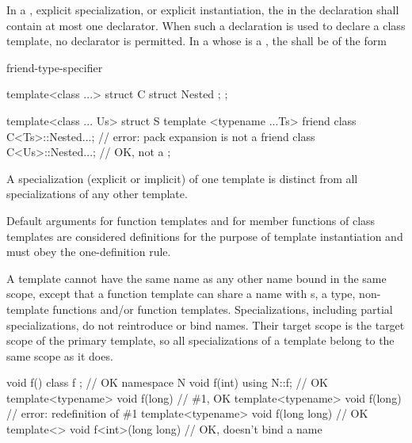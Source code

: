 \pnum
In a
,
explicit specialization, or explicit instantiation, the
in the declaration shall contain at most one declarator.
When such a declaration is used to declare a class template,
no declarator is permitted.
In a 
whose  is a ,
the  shall be of the form
\begin{ncsimplebnf}
 friend-type-specifier \terminal{;}
\end{ncsimplebnf}
\begin{example}
\begin{codeblock}
template<class ...>
struct C {
  struct Nested { };
};

template<class ... Us>
struct S {
  template <typename ...Ts>
  friend class C<Ts>::Nested...;        // error: pack expansion is not a 
  friend class C<Us>::Nested...;        // OK, not a 
};
\end{codeblock}
\end{example}

\pnum
{}%
A specialization (explicit or implicit) of one template is
distinct from all specializations of any other template.
\begin{note}
Default arguments for function templates and for member functions of
class templates are considered definitions for the purpose of template
instantiation and must obey the one-definition rule.
\end{note}

\pnum
\begin{note}
A template cannot have the same name as any other
name bound in the same scope, except
that a function template can share a name with s,
a type, non-template functions and/or function templates.
Specializations, including partial specializations,
do not reintroduce or bind names.
Their target scope is the target scope of the primary template,
so all specializations of a template belong to the same scope as it does.
\begin{example}
\begin{codeblock}
void f() {}
class f {};                                     // OK
namespace N {
  void f(int) {}
}
using N::f;                                     // OK
template<typename> void f(long) {}              // \#1, OK
template<typename> void f(long) {}              // error: redefinition of \#1
template<typename> void f(long long) {}         // OK
template<>         void f<int>(long long) {}    // OK, doesn't bind a name
\end{codeblock}
\end{example}
\end{note}

